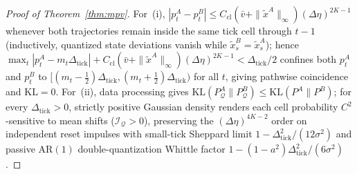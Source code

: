 \documentclass[12pt]{article}
\theoremstyle{definition}
\theoremstyle{remark}
\newcommand{\KL}{\mathrm{KL}}
\begin{document}
\begin{proof}[Proof of Theorem~\ref{thm:mpv}]
For~(i), $|p_t^A - p_t^B| \le C_{\mathrm{cl}}(\bar{v} + \|\tilde{x}^A\|_\infty)(\Delta\eta)^{2K-1}$ whenever both trajectories remain inside the same tick cell through $t - 1$ (inductively, quantized state deviations vanish while $\tilde{x}_s^B = \tilde{x}_s^A$); hence $\max_t |p_t^A - m_t \Delta_{\mathrm{tick}}| + C_{\mathrm{cl}}(\bar{v} + \|\tilde{x}^A\|_\infty)(\Delta\eta)^{2K-1} < \Delta_{\mathrm{tick}}/2$ confines both $p_t^A$ and $p_t^B$ to $[(m_t-\tfrac{1}{2})\Delta_{\mathrm{tick}}, (m_t+\tfrac{1}{2})\Delta_{\mathrm{tick}})$ for all $t$, giving pathwise coincidence and $\KL = 0$. For~(ii), data processing gives $\KL(P_{\mathcal{Q}}^A \| P_{\mathcal{Q}}^B) \le \KL(P^A \| P^B)$; for every $\Delta_{\mathrm{tick}} > 0$, strictly positive Gaussian density renders each cell probability $C^2$-sensitive to mean shifts ($\mathcal{I}_{\mathcal{Q}} > 0$), preserving the $(\Delta\eta)^{4K-2}$ order on independent reset impulses with small-tick Sheppard limit $1 - \Delta_{\mathrm{tick}}^2/(12\sigma^2)$ and passive $\mathrm{AR}(1)$ double-quantization Whittle factor $1 - (1 - a^2)\Delta_{\mathrm{tick}}^2/(6\sigma^2)$.
\end{proof}
\end{document}
